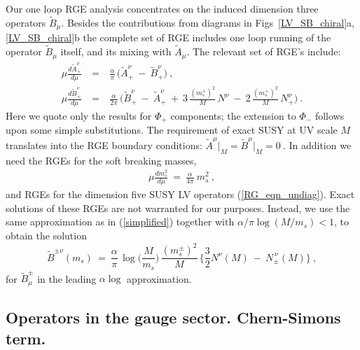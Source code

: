 \documentclass[12pt]{revtex4}
\begin{document}
Our one loop RGE analysis concentrates on the induced dimension three 
operators $ \widetilde{B}_\mu $. Besides the contributions from
diagrams in Figs~\ref{LV_SB_chiral}a, \ref{LV_SB_chiral}b the 
complete set of RGE includes one loop running of the operator $
\widetilde{B}_\mu $ itself, and its mixing with $ \widetilde{A}_\mu $.
The relevant set of RGE's include: 
\begin{eqnarray}
\label{RG_AB}
\nonumber
\mu\frac{d \widetilde{A}_+^\nu}{d\mu} 
& ~=~ &
\frac{\alpha}{\pi} \,  \Big(  \widetilde{A}_+^\nu  
~-~\widetilde{B}_+^\nu \Big)~, 
        \\
\mu\frac{d \widetilde{B}_+^\nu}{d\mu} 
& ~=~ &
\frac{\alpha}{2\pi} \, \Big(
\widetilde{B}_+^\nu  ~-~ \widetilde{A}_+^\nu  
~+~3\, \frac{(m_s^+)^2}{M}\, N^\nu 
~-~2\, \frac{(m_s^+)^2}{M}\, N_+^\nu 
\Big)~.
\end{eqnarray}
%
Here we quote only the results for $\Phi_+$ components; the extension
to $\Phi_-$ follows upon some simple substitutions. The requirement of
exact SUSY at UV scale $M$ translates into the RGE boundary
conditions:
\( 
\widetilde{A}^\mu \Bigr|_M = \widetilde{B}^\mu \Bigr|_M = 0~.
\) 
In addition we need the RGEs for the soft breaking masses, 
%
\begin{eqnarray}
       \mu \frac{d m_s^2}
               {d\mu}            ~ =~ 
        \frac{\alpha}{4\pi}~ m_s^2~,
\end{eqnarray}
%
and RGEs for the dimension five SUSY LV operators
(\ref{RG_eqn_undiag}).   Exact solutions of these RGEs are not
warranted for our purposes. Instead, we use the same approximation as
in (\ref{simplified}) together with  
$ \alpha/\pi \log (M/m_s) < 1$,
to obtain the solution 
\begin{equation}
\label{B_mu_coef}
\widetilde{B}^{\pm\nu} (m_s) ~=~ \frac{\alpha}{\pi}\, 
\log \big(\frac{M}{m_s}\big)\,
\frac{(m_{s}^\pm)^2 }{M}\, 
\Big\{ 
\frac{3}
     {2} N^\nu(M) 
~-~ N_\pm^{\,\nu}(M)
\Big\}~,
\end{equation}
%
for $\widetilde{B}^\pm_\mu$ in the leading 
$\alpha\log$ approximation.




\subsection{Operators in the gauge sector. Chern-Simons term.}
\label{SB_gauge_sector}
   
\end{document}
